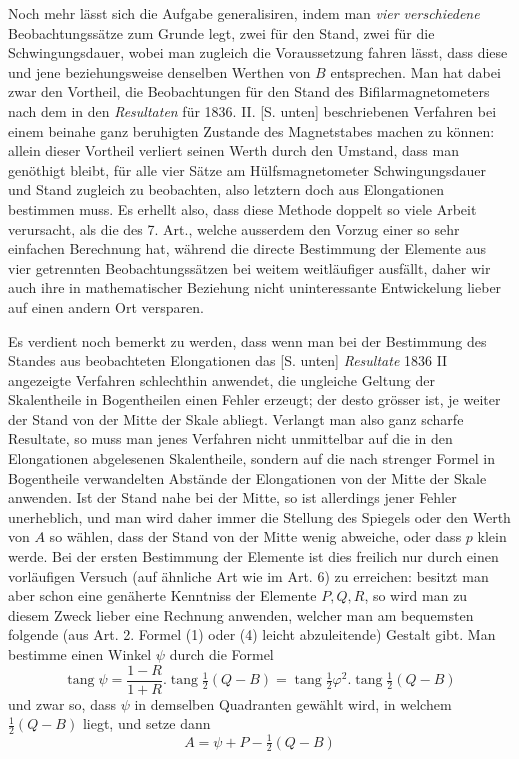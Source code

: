 Noch mehr lässt sich die Aufgabe generalisiren, indem man \textit{vier verschiedene} Beobachtungssätze zum Grunde legt, zwei für den Stand, zwei für die Schwingungsdauer, wobei man zugleich die Voraussetzung fahren lässt, dass diese und jene beziehungsweise denselben Werthen von $B$ entsprechen. Man hat dabei zwar den Vortheil, die Beobachtungen für den Stand des Bifilarmagnetometers nach dem in den \textit{Resultaten} für 1836. II. [S. unten] beschriebenen Verfahren bei einem beinahe ganz beruhigten Zustande des Magnetstabes machen zu können: allein dieser Vortheil verliert seinen Werth durch den Umstand, dass man genöthigt bleibt, für alle vier Sätze am Hülfsmagnetometer Schwingungsdauer und Stand zugleich zu beobachten, also letztern doch aus Elongationen bestimmen muss. Es erhellt also, dass diese Methode doppelt so viele Arbeit verursacht, als die des 7. Art., welche ausserdem den Vorzug einer so sehr einfachen Berechnung hat, während die directe Bestimmung der Elemente aus vier getrennten Beobachtungssätzen bei weitem weitläufiger ausfällt, daher wir auch ihre in mathematischer Beziehung nicht uninteressante Entwickelung lieber auf einen andern Ort versparen.

Es verdient noch bemerkt zu werden, dass wenn man bei der Bestimmung des Standes aus beobachteten Elongationen das [S. unten] \textit{Resultate} 1836 II
angezeigte Verfahren schlechthin anwendet, die ungleiche Geltung der Skalentheile in Bogentheilen einen Fehler erzeugt; der desto grösser ist, je weiter der Stand von der Mitte der Skale abliegt. Verlangt man also ganz scharfe Resultate, so muss man jenes Verfahren nicht unmittelbar auf die in den Elongationen abgelesenen Skalentheile, sondern auf die nach strenger Formel in Bogentheile verwandelten Abstände der Elongationen von der Mitte der Skale anwenden. Ist der Stand nahe bei der Mitte, so ist allerdings jener Fehler unerheblich, und man wird daher immer die Stellung des Spiegels oder den Werth von $A$ so wählen, dass der Stand von der Mitte wenig abweiche, oder dass $p$ klein werde. Bei der ersten Bestimmung der Elemente ist dies freilich nur durch einen vorläufigen Versuch (auf ähnliche Art wie im Art. 6) zu erreichen: besitzt man aber schon eine genäherte Kenntniss der Elemente $P,Q,R$, so wird man zu diesem Zweck lieber eine Rechnung anwenden, welcher man am bequemsten folgende (aus Art. 2. Formel (1) oder (4) leicht abzuleitende) Gestalt gibt. Man bestimme einen Winkel $\psi$ durch die Formel
\[
\operatorname{tang}\psi=\frac{1-R}{1+R}.\operatorname{tang}\tfrac12(Q-B)=\operatorname{tang}\tfrac12\varphi^2.\operatorname{tang}\tfrac12(Q-B)
\]
und zwar so, dass $\psi$ in demselben Quadranten gewählt wird, in welchem $\tfrac12(Q-B)$ liegt, und setze dann
\[
A=\psi+P-\tfrac12(Q-B)
\]

